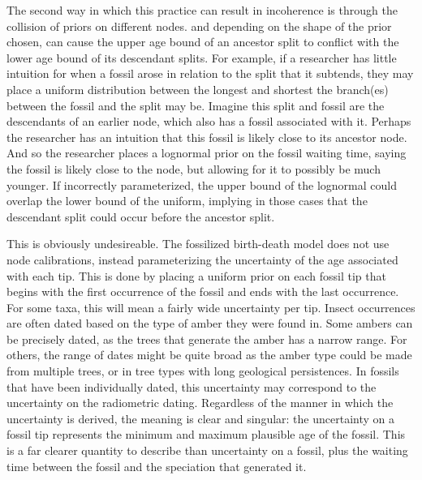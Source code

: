 \documentclass{article}
\begin{document}
The second way in which this practice can result in incoherence is through the collision of priors on different nodes.
and depending on the shape of the prior chosen, can cause the upper age bound of an ancestor split to conflict with the lower age bound of its descendant splits. 
For example, if a researcher has little intuition for when a fossil arose in relation to the split that it subtends, they may place a uniform distribution between the longest and shortest the branch(es) between the fossil and the split may be.
Imagine this split and fossil are the descendants of an earlier node, which also has a fossil associated with it. 
Perhaps the researcher has an intuition that this fossil is likely close to its ancestor node. 
And so the researcher places a lognormal prior on the fossil waiting time, saying the fossil is likely close to the node, but allowing for it to possibly be much younger. 
If incorrectly parameterized, the upper bound of the lognormal could overlap the lower bound of the uniform, implying in those cases that the descendant split could occur before the ancestor split.

This is obviously undesireable.
The fossilized birth-death model does not use node calibrations, instead parameterizing the uncertainty of the age associated with each tip.
This is done by placing a uniform prior on each fossil tip that begins with the first occurrence of the fossil and ends with the last occurrence. 
For some taxa, this will mean a fairly wide uncertainty per tip.
Insect occurrences are often dated based on the type of amber they were found in.
Some ambers can be precisely dated, as the trees that generate the amber has a narrow range.
For others, the range of dates might be quite broad as the amber type could be made from multiple trees, or in tree types with long geological persistences. 
In fossils that have been individually dated, this uncertainty may correspond to the uncertainty on the radiometric dating.
Regardless of the manner in which the uncertainty is derived, the meaning is clear and singular: the uncertainty on a fossil tip represents the minimum and maximum plausible age of the fossil.
This is a far clearer quantity to describe than uncertainty on a fossil, plus the waiting time between the fossil and the speciation that generated it. 
\end{document}
